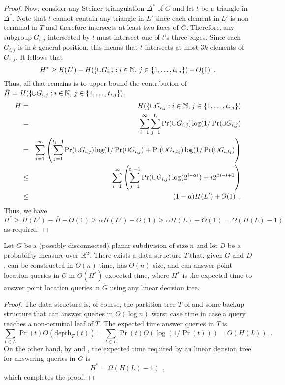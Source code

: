 \documentclass{patmorin}
\newcommand{\depth}{\mathrm{depth}}
\begin{document}
\begin{proof}
  Now, consider any Steiner triangulation $\Delta^*$ of $G$ and let
  $t$ be a triangle in $\Delta^*$.  Note that $t$ cannot contain any
  triangle in $L'$ since each element in $L'$ is non-terminal in $T$
  and therefore intersects at least two faces of $G$.  Therefore,
  any subgroup $G_{i,j}$ intersected by $t$ must intersect one of
  $t$'s three edges. Since each $G_{i,j}$ is in $k$-general position,
  this means that $t$ intersects at most $3k$ elements of $G_{i,j}$.
  It follows \cite[Lemma~3]{cdilm09} that
  \[
    H^* \ge H(L') 
       - H(\{\cup G_{i,j}:i\in\mathbb{N},\, j \in\{1,\ldots,t_{i,j}\}) 
       - O(1) \enspace .
  \]
  Thus, all that remains is to upper-bound the contribution of $\bar{H}=H(\{\cup G_{i,j}:i\in\mathbb{N},\, j \in\{1,\ldots,t_{i,j}\})$.
  \begin{eqnarray*}
    \bar{H} &= & H(\{\cup G_{i,j}:i\in\mathbb{N},\, j \in\{1,\ldots,t_{i,j}\}) \\
     & = & \sum_{i=1}^\infty \sum_{j=1}^{t_{i}} 
         \Pr(\cup G_{i,j})\log(1/\Pr(\cup G_{i,j}) \\
   & = & \sum_{i=1}^\infty
        \left( 
          \sum_{j=1}^{t_{i}-1} 
             \Pr(\cup G_{i,j})\log(1/\Pr(\cup G_{i,j}) 
             + \Pr(\cup G_{i,t_i})\log(1/\Pr(\cup G_{i,t_i})
        \right) \\
   & \le & \sum_{i=1}^\infty
        \left( 
          \sum_{j=1}^{t_{i}-1} 
             \Pr(\cup G_{i,j})\log(2^{i-\alpha i})
             + i 2^{\beta i - i + 1}
        \right) \\
    & \le & (1-\alpha)H(L') + O(1) \enspace .
  \end{eqnarray*}
  Thus, we have 
  \[  
     H^* \ge H(L') - \bar{H} -O(1) \ge \alpha H(L') - O(1) 
         \ge \alpha H(L) - O(1) = \Omega(H(L) - 1) 
  \]
  as required.
\end{proof}

\begin{thm}
  Let $G$ be a (possibly disconnected) planar subdivision of size $n$
  and let $D$ be a probability measure over $\mathbb{R}^2$.  There exists a data
  structure $T$ that, given $G$ and $D$, can be constructed in $O(n)$
  time, has $O(n)$ size, and can answer point location queries in $G$
  in $O(H^*)$ expected time, where $H^*$ is the expected time to answer
  point location queries in $G$ using any linear decision tree.
\end{thm}

\begin{proof}
  The data structure is, of course, the partition tree $T$ of
   and some backup structure that can answer
  queries in $O(\log n)$ worst case time in case a query reaches a
  non-terminal leaf of $T$.  The expected time answer queries in $T$ is
  \[
     \sum_{t\in L} \Pr(t)O(\depth_T(t)) = \sum_{t\in L}\Pr(t)O(\log(1/\Pr(t))) = O(H(L)) \enspace .
  \]
  On the other hand, by  and ,
  the expected time required by an linear decision tree for answering
  queries in $G$ is
  \[
      H^* = \Omega(H(L) - 1) \enspace ,
  \]
  which completes the proof.
\end{proof}
\end{document}
